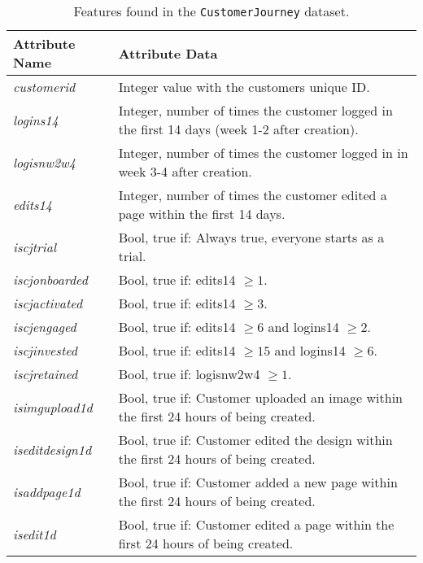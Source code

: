 \begin{table}[H]
    \centering
    \begin{tabularx}{\textwidth}{l|X}
        \textbf{Attribute Name} & \textbf{Attribute Data}                                                                      \\ \hline
        \textit{customerid}     & Integer value with the customers unique ID.                                                  \\
        \textit{logins14}       & Integer, number of times the customer logged in the first 14 days (week 1-2 after creation). \\
        \textit{logisnw2w4}     & Integer, number of times the customer logged in in week 3-4 after creation.                  \\
        \textit{edits14}        & Integer, number of times the customer edited a page within the first 14 days.                \\
        \textit{iscjtrial}      & Bool, true if: Always true, everyone starts as a trial.                                      \\
        \textit{iscjonboarded}  & Bool, true if: edits14 $\geq 1$.                                                             \\
        \textit{iscjactivated}  & Bool, true if: edits14 $\geq 3$.                                                             \\
        \textit{iscjengaged}    & Bool, true if: edits14 $\geq 6$ and logins14 $\geq 2$.                                       \\
        \textit{iscjinvested}   & Bool, true if: edits14 $\geq 15$ and logins14 $\geq 6$.                                      \\
        \textit{iscjretained}   & Bool, true if: logisnw2w4 $\geq 1$.                                                          \\
        \textit{isimgupload1d}  & Bool, true if: Customer uploaded an image within the first 24 hours of being created.        \\
        \textit{iseditdesign1d} & Bool, true if: Customer edited the design within the first 24 hours of being created.        \\
        \textit{isaddpage1d}    & Bool, true if: Customer added a new page within the first 24 hours of being created.         \\
        \textit{isedit1d}       & Bool, true if: Customer edited a page within the first 24 hours of being created.           
    \end{tabularx}
    \caption{Features found in the \texttt{CustomerJourney} dataset.}
    \label{tab:cjdatalayout}
\end{table}